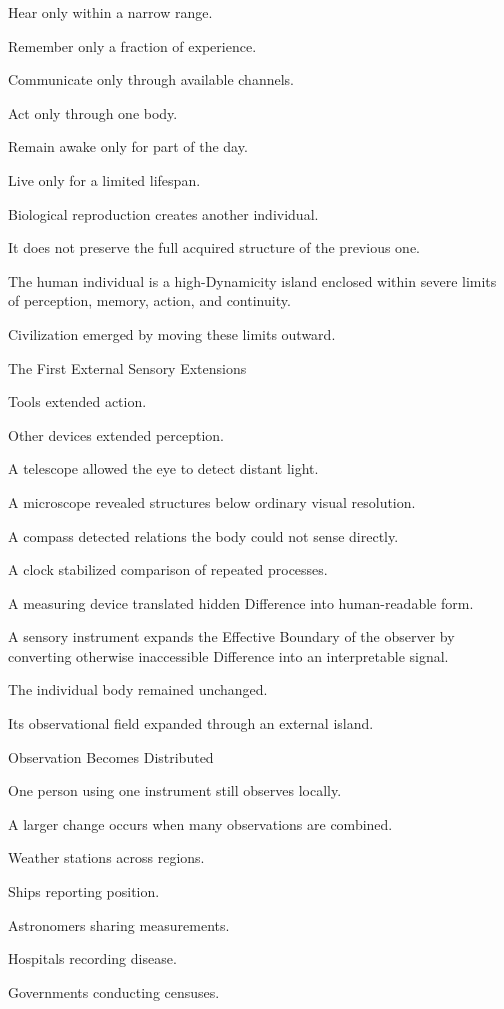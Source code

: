 Hear only within a narrow range.

Remember only a fraction of experience.

Communicate only through available channels.

Act only through one body.

Remain awake only for part of the day.

Live only for a limited lifespan.

Biological reproduction creates another individual.

It does not preserve the full acquired structure of the previous one.

The human individual is a high-Dynamicity island enclosed within severe limits of perception, memory, action, and continuity.

Civilization emerged by moving these limits outward.

The First External Sensory Extensions

Tools extended action.

Other devices extended perception.

A telescope allowed the eye to detect distant light.

A microscope revealed structures below ordinary visual resolution.

A compass detected relations the body could not sense directly.

A clock stabilized comparison of repeated processes.

A measuring device translated hidden Difference into human-readable form.

A sensory instrument expands the Effective Boundary of the observer by converting otherwise inaccessible Difference into an interpretable signal.

The individual body remained unchanged.

Its observational field expanded through an external island.

Observation Becomes Distributed

One person using one instrument still observes locally.

A larger change occurs when many observations are combined.

Weather stations across regions.

Ships reporting position.

Astronomers sharing measurements.

Hospitals recording disease.

Governments conducting censuses.

